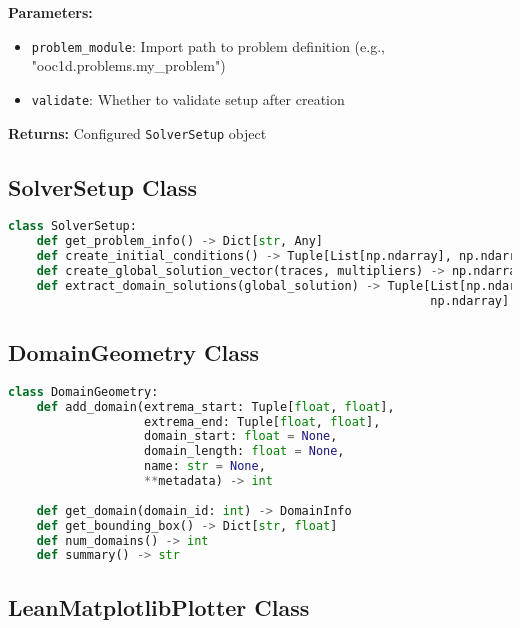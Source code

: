 \documentclass[11pt,a4paper]{article}
\newcommand{\code}[1]{\texttt{#1}}
\begin{document}
\textbf{Parameters:}
\begin{itemize}
    \item \code{problem\_module}: Import path to problem definition (e.g., "ooc1d.problems.my\_problem")
    \item \code{validate}: Whether to validate setup after creation
\end{itemize}

\textbf{Returns:} Configured \code{SolverSetup} object

\subsection{SolverSetup Class}

\begin{lstlisting}[language=Python, caption={SolverSetup API}]
class SolverSetup:
    def get_problem_info() -> Dict[str, Any]
    def create_initial_conditions() -> Tuple[List[np.ndarray], np.ndarray]
    def create_global_solution_vector(traces, multipliers) -> np.ndarray
    def extract_domain_solutions(global_solution) -> Tuple[List[np.ndarray], 
                                                           np.ndarray]
\end{lstlisting}

\subsection{DomainGeometry Class}

\begin{lstlisting}[language=Python, caption={DomainGeometry API}]
class DomainGeometry:
    def add_domain(extrema_start: Tuple[float, float],
                   extrema_end: Tuple[float, float],
                   domain_start: float = None,
                   domain_length: float = None,
                   name: str = None,
                   **metadata) -> int
    
    def get_domain(domain_id: int) -> DomainInfo
    def get_bounding_box() -> Dict[str, float]
    def num_domains() -> int
    def summary() -> str
\end{lstlisting}

\subsection{LeanMatplotlibPlotter Class}
\end{document}
